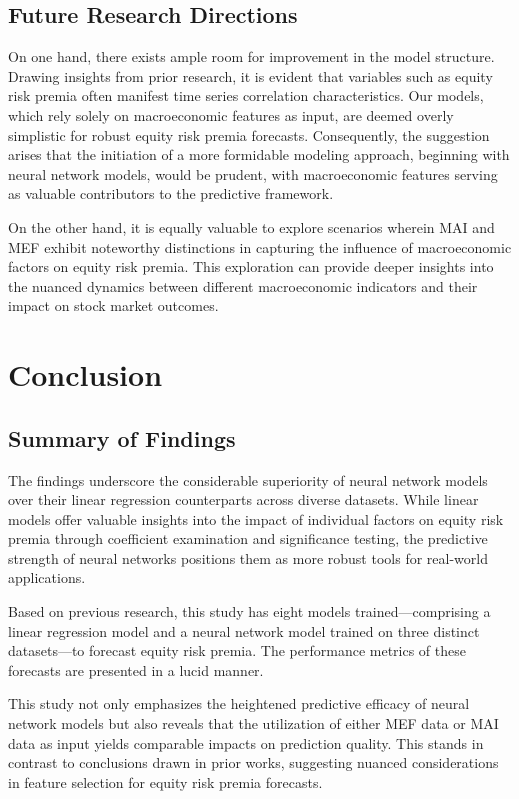 \documentclass{article}
\begin{document}
\subsection{Future Research Directions}

On one hand, there exists ample room for improvement in the model structure. Drawing insights from prior research, it is evident that variables such as equity risk premia often manifest time series correlation characteristics. Our models, which rely solely on macroeconomic features as input, are deemed overly simplistic for robust equity risk premia forecasts. Consequently, the suggestion arises that the initiation of a more formidable modeling approach, beginning with neural network models, would be prudent, with macroeconomic features serving as valuable contributors to the predictive framework.

On the other hand, it is equally valuable to explore scenarios wherein MAI and MEF exhibit noteworthy distinctions in capturing the influence of macroeconomic factors on equity risk premia. This exploration can provide deeper insights into the nuanced dynamics between different macroeconomic indicators and their impact on stock market outcomes.

\newpage

\section{Conclusion}

\subsection{Summary of Findings}

The findings underscore the considerable superiority of neural network models over their linear regression counterparts across diverse datasets. While linear models offer valuable insights into the impact of individual factors on equity risk premia through coefficient examination and significance testing, the predictive strength of neural networks positions them as more robust tools for real-world applications.

Based on previous research, this study has eight models trained—comprising a linear regression model and a neural network model trained on three distinct datasets—to forecast equity risk premia. The performance metrics of these forecasts are presented in a lucid manner.

This study not only emphasizes the heightened predictive efficacy of neural network models but also reveals that the utilization of either MEF data or MAI data as input yields comparable impacts on prediction quality. This stands in contrast to conclusions drawn in prior works, suggesting nuanced considerations in feature selection for equity risk premia forecasts.
\end{document}

